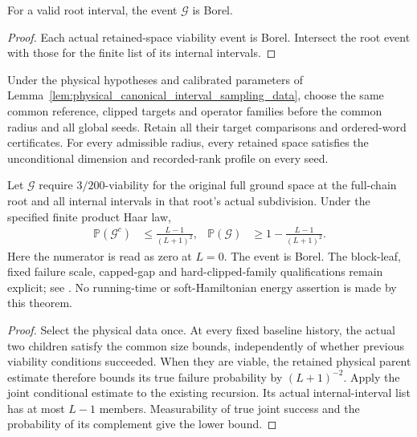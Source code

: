 \begin{lemma}
    \label{lem:borel_canonical_interval_sampling_tree_good}
    \leanok
    For a valid root interval, the event $\mathcal G$ is Borel.
\end{lemma}
\begin{proof}\leanok
    Each actual retained-space viability event is Borel. Intersect the
    root event with those for the finite list of its internal intervals.
\end{proof}

\begin{theorem}
    \label{thm:physical_canonical_tree_joint_probability}
    \leanok
    Under the physical hypotheses and calibrated parameters of
    Lemma~\ref{lem:physical_canonical_interval_sampling_data}, choose the
    same common reference, clipped targets and operator families before
    the common radius and all global seeds. Retain all their target
    comparisons and ordered-word certificates. For every admissible
    radius, every retained space satisfies the unconditional dimension
    and recorded-rank profile on every seed.

    Let $\mathcal G$ require $3/200$-viability for the original full ground
    space at the full-chain root and all internal intervals in that
    root's actual subdivision. Under the specified finite product Haar
    law,
    \begin{align}
        \mathbb P(\mathcal G^c) & \le\frac{L-1}{(L+1)^2},
                                & \mathbb P(\mathcal G)   & \ge1-\frac{L-1}{(L+1)^2}.
    \end{align}
    Here the numerator is read as zero at $L=0$. The event is Borel.
    The block-leaf, fixed failure scale, capped-gap and hard-clipped-family
    qualifications remain explicit; see
    \cite{gap:alvv16_approximation_parameters}. No running-time or
    soft-Hamiltonian energy assertion is made by this theorem.
\end{theorem}
\begin{proof}\leanok
    Select the physical data once. At every fixed baseline history, the
    actual two children satisfy the common size bounds, independently of
    whether previous viability conditions succeeded. When they are
    viable, the retained physical parent estimate therefore bounds its
    true failure probability by $(L+1)^{-2}$. Apply the joint conditional
    estimate to the existing recursion. Its actual internal-interval list
    has at most $L-1$ members. Measurability of true joint success and
    the probability of its complement give the lower bound.
\end{proof}


